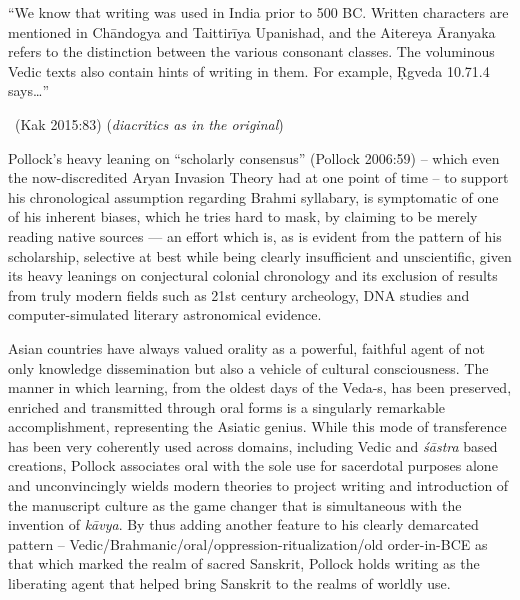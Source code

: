 \begin{myquote}
“We know that writing was used in India prior to 500 BC. Written characters are mentioned in Chāndogya and Taittirīya Upanishad, and the Aitereya Āranyaka refers to the distinction between the various consonant classes. The voluminous Vedic texts also contain hints of writing in them. For example, Ṛgveda 10.71.4 says…” 

~\hfill (Kak 2015:83) (\textit{diacritics as in the original})
\end{myquote}

Pollock’s heavy leaning on “scholarly consensus” (Pollock 2006:59) – which even the now-discredited Aryan Invasion Theory had at one point of time – to support his chronological assumption regarding Brahmi syllabary, is symptomatic of one of his inherent biases, which he tries hard to mask, by claiming to be merely reading native sources — an effort which is, as is evident from the pattern of his scholarship, selective at best while being clearly insufficient and unscientific, given its heavy leanings on conjectural colonial chronology and its exclusion of results from truly modern fields such as 21st century archeology, DNA studies and computer-simulated literary astronomical evidence.

Asian countries have always valued orality as a powerful, faithful agent of not only knowledge dissemination but also a vehicle of cultural consciousness. The manner in which learning, from the oldest days of the Veda-s, has been preserved, enriched and transmitted through oral forms is a singularly remarkable accomplishment, representing the Asiatic genius. While this mode of transference has been very coherently used across domains, including Vedic and \textit{śāstra} based creations, Pollock associates oral with the sole use for sacerdotal purposes alone and unconvincingly wields modern theories to project writing and introduction of the manuscript culture as the game changer that is simultaneous with the invention of \textit{kāvya}. By thus adding another feature to his clearly demarcated pattern – Vedic/Brahmanic/oral/oppression-ritualization/old order-in-BCE as that which marked the realm of sacred Sanskrit, Pollock holds writing as the liberating agent that helped bring Sanskrit to the realms of worldly use.

